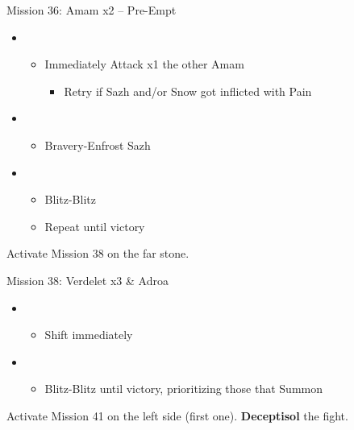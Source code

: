 \begin{battle}{Mission 36: Amam x2 -- Pre-Empt}
	\begin{itemize}
		\item \fourth
			\begin{itemize}
				\item Immediately Attack x1 the other Amam
					\begin{itemize}
						\item Retry if Sazh and/or Snow got inflicted with Pain
					\end{itemize}
			\end{itemize}
		\item \third
			\begin{itemize}
				\item Bravery-Enfrost Sazh
			\end{itemize}
		\item \fifth
			\begin{itemize}
				\item Blitz-Blitz
				\item Repeat until victory
			\end{itemize}																		
	\end{itemize}
\end{battle}

Activate Mission 38 on the far stone.

\begin{battle}{Mission 38: Verdelet x3 \& Adroa}
	\begin{itemize}
		\item \fourth
			\begin{itemize}
				\item Shift immediately
			\end{itemize}
		\item \first
			\begin{itemize}
				\item Blitz-Blitz until victory, prioritizing those that Summon
			\end{itemize}
	\end{itemize}
\end{battle}

Activate Mission 41 on the left side (first one).
\textbf{Deceptisol} the fight.

